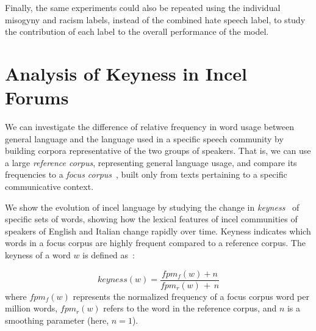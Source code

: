 \documentclass[11pt]{article}
\newcommand{\paolo}[1]{{\color{red} #1}}
\newcommand{\todoA}[1]{\todo[color=blue!40]{A: #1}}
\begin{document}
Finally, the same experiments could also be repeated using the individual misogyny and racism labels, instead of the combined hate speech label, to study the contribution of each label to the overall performance of the model.




\appendix

\section{Analysis of Keyness in Incel Forums}
\label{app:keyness}

We can investigate the difference of relative frequency in word usage between general language and the language used in a specific speech community by building corpora representative of the two groups of speakers. That is, we can use a large \textit{reference corpus},
representing general language usage, and compare its frequencies to a \textit{focus corpus}~\cite{kilgarriff2009simple}, built only from texts pertaining to a specific communicative context.

We show the evolution of incel language by studying the change in 
\textit{keyness}~\cite{kilgarriff2009simple} 
of specific sets of words, showing how the lexical features of incel 
communities of speakers of English and Italian
change rapidly over time.
Keyness indicates which words in a focus corpus are highly frequent compared to a reference corpus. 
The keyness of a word $w$ is defined as~\cite{lexical_computing_2015}:%

\begin{equation}
keyness(w) = \frac{fpm_f(w) + n}
                {fpm_r(w)\, + \,n}
\end{equation}
%
\paolo{where $fpm_f(w)$ represents the normalized frequency of a focus corpus word per million words,} $fpm_r(w)$ refers to the word in the reference corpus, and $n$ is a smoothing parameter (here, $n=1$).
\end{document}
